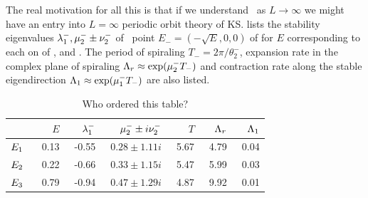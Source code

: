 The real motivation for all this is that if we understand \eqva\ as
$L \to \infty$ we might have an entry into $L = \infty$ periodic orbit
theory of KS.
 lists the stability eigenvalues
$\eigExp[1]^-,\eigRe[2]^-\pm\eigIm[2]^-$
of \eqv\ point $E_{-}=(-\sqrt{E},0,0)$
of  for $E$ corresponding to each on of , 
 and  \eqva.
The period of spiraling $T_{-}=2\pi/\theta^-_2$, expansion
rate in the complex plane of spiraling
$\ExpaEig_r\approx\exp(\eigRe[2]^- T_-)$ and contraction
rate along the stable eigendirection
$\ExpaEig_1\approx\exp(\eigRe[1]^- T_-)$ are also listed.

\begin{table}[h!]
    \caption{Who ordered this table? }
\begin{center} \footnotesize
    \begin{tabular}{l|rrrrrr}
                & $E$   &$\eigExp[1]^-$ & $\eigRe[2]^-\pm i \eigIm[2]^-$   & $T$ & $\ExpaEig_r$  & $\ExpaEig_1$  \\ \hline
        $\EQV{1}\ $ &\ 0.13 &\ -0.55    &\ $0.28\pm1.11i$       &\ 5.67     &\ 4.79     &\ 0.04 \\ \hline
        $\EQV{2}\ $     &\ 0.22 &\ -0.66    &\ $0.33\pm1.15i$       &\ 5.47     &\ 5.99     &\ 0.03 \\ \hline
        $\EQV{3}\ $     &\ 0.79 &\ -0.94    &\ $0.47\pm1.29i$       &\ 4.87     &\ 9.92     &\ 0.01
    \end{tabular}
\end{center}
\label{tab:L22cminus}
\end{table}
